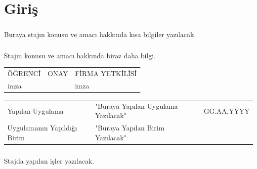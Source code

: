 \documentclass[12pt,a4paper]{report}
\begin{document}
\newpage %

\chapter*{Giriş}

\paragraph{} Buraya stajın konusu ve amacı hakkında kısa bilgiler yazılacak.
\paragraph{} Stajın konusu ve amacı hakkında biraz daha bilgi.
\mbox{}
\vfill
\begin{center}
\begin{tabular}{|>{\centering}m{3.6cm}|>{\centering}m{7.4cm}|>{\centering}m{4cm}|}
ÖĞRENCİ&ONAY&FİRMA YETKİLİSİ
\tabularnewline
imza &&imza
\end{tabular}
\end{center}


\newpage %
 
\begin{center}
\begin{tabular}{llr}
\parbox[c]{5cm}{Yapılan Uygulama}
&\parbox[c]{8cm}{"Buraya Yapılan Uygulama Yazılacak"} %
&\parbox[c]{3cm}{GG.AA.YYYY}%
\\
\parbox[c]{5cm}{Uygulamanın Yapıldığı Birim}
&\parbox[c]{8cm}{"Buraya Yapılan Birim Yazılacak"} %
\end{tabular}
\end{center}

\paragraph{} Stajda yapılan işler yazılacak.
\end{document}
